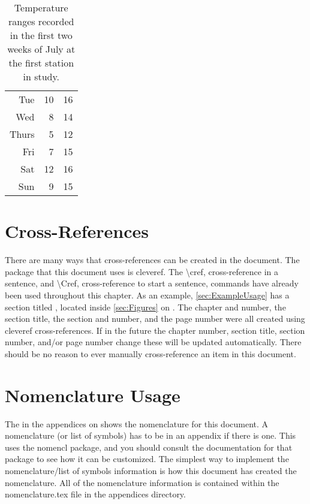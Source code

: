 \begin{table}
\begin{subtable}[h]{0.375\textwidth}
\begin{tabular}{r r r}
                Tue   & 10 & 16 \\
                Wed   & 8  & 14 \\
                Thurs & 5  & 12 \\
                Fri   & 7  & 15 \\
                Sat   & 12 & 16 \\
                Sun   & 9  & 15 \\
                \hline
            \end{tabular}
        \end{subtable}
        \caption{Temperature ranges recorded in the first two weeks of July at the first station in study.}
        \label{tab:temps}
    \end{table}

\section{Cross-References} \label{sec:CrossReferences}
    There are many ways that cross-references can be created in the document.
    The package that this document uses is cleveref.
    The \textbackslash cref, cross-reference in a sentence, and \textbackslash Cref, cross-reference to start a sentence, commands have already been used throughout this chapter.
    As an example, \cref{sec:ExampleUsage} has a section titled , located inside \cref{sec:Figures} on .
    The chapter and number, the section title, the section and number, and the page number were all created using cleveref cross-references.
    If in the future the chapter number, section title, section number, and/or page number change these will be updated automatically.
    There should be no reason to ever manually cross-reference an item in this document.

\section{Nomenclature Usage} \label{sec:NomenclatureUsage}
    The  in the appendices on  shows the nomenclature for this document.
    A nomenclature (or list of symbols) has to be in an appendix if there is one.
    This uses the nomencl package, and you should consult the documentation for that package to see how it can be customized.
    The simplest way to implement the nomenclature/list of symbols information is how this document has created the nomenclature.
    All of the nomenclature information is contained within the nomenclature.tex file in the appendices directory.

